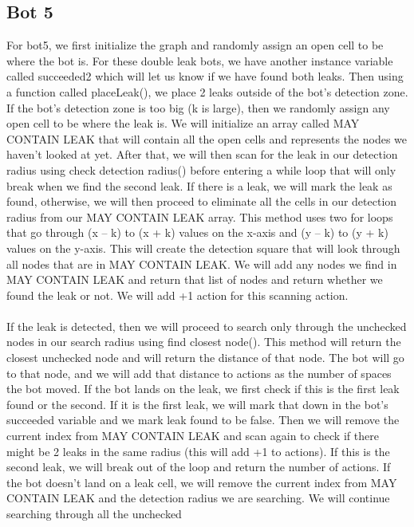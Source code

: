 \documentclass[12pt]{article}
\begin{document}
\subsection*{Bot 5}
For bot5, we first initialize the graph and randomly assign an open cell to be where the bot is. For 
these double leak bots, we have another instance variable called succeeded2 which will let us know if we 
have found both leaks. Then using a function called placeLeak(), we place 2 leaks outside of the bot's 
detection zone. If the bot's detection zone is too big (k is large), then we randomly assign any open cell to 
be where the leak is. We will initialize an array called MAY CONTAIN LEAK that will contain all the open cells 
and represents the nodes we haven't looked at yet. After that, we will then scan for the leak in our 
detection radius using check detection radius() before entering a while loop that will only break when we 
find the second leak. If there is a leak, we will mark the leak as found, otherwise, we will then proceed 
to eliminate all the cells in our detection radius from our MAY CONTAIN LEAK array. This method uses two 
for loops that go through (x – k) to (x + k) values on the x-axis and (y – k) to (y + k) values on the y-axis. 
This will create the detection square that will look through all nodes that are in MAY CONTAIN LEAK. We will 
add any nodes we find in MAY CONTAIN LEAK and return that list of nodes and return whether we found the leak or 
not. We will add +1 action for this scanning action.  
\\
\\
If the leak is detected, then we will proceed to search only through the unchecked nodes in our search 
radius using find closest node(). This method will return the closest unchecked node and will return the 
distance of that node. The bot will go to that node, and we will add that distance to actions as the number of 
spaces the bot moved. If the bot lands on the leak, we first check if this is the first leak found or the second. 
If it is the first leak, we will mark that down in the bot's succeeded variable and we mark leak found to be false. 
Then we will remove the current index from MAY CONTAIN LEAK and scan again to check if there might be 2 leaks 
in the same radius (this will add +1 to actions). If this is the second leak, we will break out of the loop and 
return the number of actions. If the bot doesn't land on a leak cell, we will remove the current index from 
MAY CONTAIN LEAK and the detection radius we are searching. We will continue searching through all the unchecked 
\end{document}
